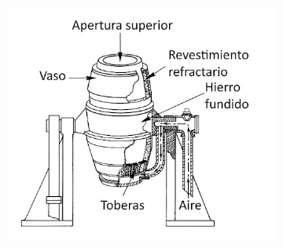 \documentclass[12pt,a4paper]{article}
\begin{document}
 \begin{figure}
    \centering
    \begin{subfigure}{0.45\textwidth}
        \centering
        \includegraphics[width=\textwidth]{Inagenes para latex/convertidor baser.png}
        \label{bessemer}


\end{subfigure}
\end{figure}
\end{document}
